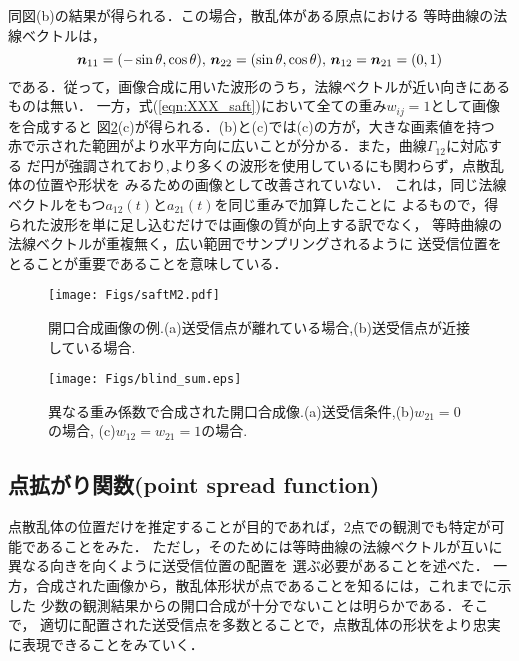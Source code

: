 同図(b)の結果が得られる．この場合，散乱体がある原点における
等時曲線の法線ベクトルは，
\begin{equation}
	\mbox{\boldmath $n$}_{11}=(-\sin\theta,\cos\theta), \,
	\mbox{\boldmath $n$}_{22}=( \sin\theta,\cos\theta), \,
	\mbox{\boldmath $n$}_{12}=\mbox{\boldmath $n$}_{21}=(0,1)
	\label{eqn:XXX_11}
\end{equation}
である．従って，画像合成に用いた波形のうち，法線ベクトルが近い向きにあるものは無い．
一方，式(\ref{eqn:XXX_saft})において全ての重み$w_{ij}=1$として画像を合成すると
図\ref{fig:XXX_blind_sum}(c)が得られる．(b)と(c)では(c)の方が，大きな画素値を持つ
赤で示された範囲がより水平方向に広いことが分かる．また，曲線$\Gamma_{12}$に対応する
だ円が強調されており,より多くの波形を使用しているにも関わらず，点散乱体の位置や形状を
みるための画像として改善されていない．
これは，同じ法線ベクトルをもつ$a_{12}(t)$と$a_{21}(t)$を同じ重みで加算したことに
よるもので，得られた波形を単に足し込むだけでは画像の質が向上する訳でなく，
等時曲線の法線ベクトルが重複無く，広い範囲でサンプリングされるように
送受信位置をとることが重要であることを意味している．

\begin{figure}[h]
	\begin{center}
	\texttt{[image: Figs/saftM2.pdf]} 
	\end{center}
	\caption{開口合成画像の例.(a)送受信点が離れている場合,(b)送受信点が近接している場合.} 
	\label{fig:XXX_saftM2}
\end{figure}
\begin{figure}[h]
	\begin{center}
	\texttt{[image: Figs/blind\_sum.eps]} 
	\end{center}
	\caption{異なる重み係数で合成された開口合成像.(a)送受信条件,(b)$w_{21}=0$の場合, (c)$w_{12}=w_{21}=1$の場合.}
	\label{fig:XXX_blind_sum}
\end{figure}
\subsection{点拡がり関数(point spread function)}
点散乱体の位置だけを推定することが目的であれば，2点での観測でも特定が可能であることをみた．
ただし，そのためには等時曲線の法線ベクトルが互いに異なる向きを向くように送受信位置の配置を
選ぶ必要があることを述べた．
一方，合成された画像から，散乱体形状が点であることを知るには，これまでに示した
少数の観測結果からの開口合成が十分でないことは明らかである．そこで，
適切に配置された送受信点を多数とることで，点散乱体の形状をより忠実に表現できることをみていく．

